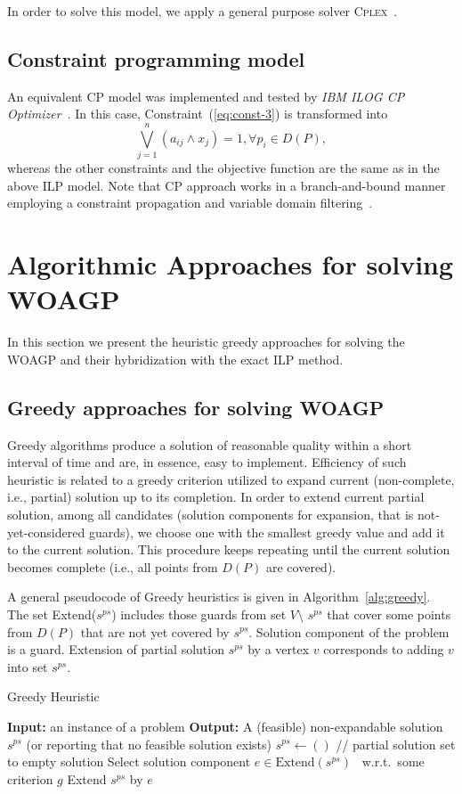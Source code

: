 \documentclass[runningheads,a4paper]{elsarticle}
\begin{document}
	In order to solve this model, we apply a general purpose solver \textsc{Cplex}~\cite{lima2010ibm}.
	\subsection{Constraint programming model} An equivalent CP model was implemented and tested by \textit{IBM ILOG CP Optimizer}~\cite{laborie2018ibm}. In this case,  Constraint~(\ref{eq:const-3}) is transformed into
	\begin{equation}
	\bigvee_{ j=1}^n (a_{ij} \wedge x_j) = 1, \forall p_i \in D(P),
	\end{equation}
	whereas the other constraints and the objective function are the same as in the above ILP model. Note that CP approach works in a branch-and-bound manner employing a constraint propagation and variable domain filtering~\cite{rossi2006handbook}.
	\section{Algorithmic Approaches for solving WOAGP}
	In this section we present the heuristic greedy approaches for solving the WOAGP and their hybridization with the exact ILP method.
	\subsection{Greedy approaches for solving WOAGP}
 Greedy algorithms produce a solution of reasonable quality within a short interval of time and are, in essence, easy to implement. Efficiency of such  heuristic is related to a greedy criterion utilized to expand current (non-complete, i.e., partial) solution up to its completion. In order to extend current partial solution, among all candidates (solution components for expansion, that is not-yet-considered guards),  we choose one with the smallest greedy value and add it to the current solution. This procedure keeps repeating until the current solution becomes complete (i.e., all points from $D(P)$ are covered).

 A general pseudocode of Greedy heuristics is given in Algorithm~\ref{alg:greedy}. 	The set Extend($s^{ps}$) includes those guards from set $V \setminus$ $s^{ps}$ that cover some points from $D(P)$ that are not yet covered by $s^{ps}$. Solution component of the problem is a guard. Extension of partial solution $s^{ps}$ by a vertex $v$ corresponds to adding $v$ into set $s^{ps}$.
	
	\begin{algorithm}[!t]
		\caption{Greedy Heuristic}\label{alg:greedy}
		\begin{algorithmic}[1]
			\State \textbf{Input:} an instance of a problem
			\State \textbf{Output:} A (feasible) non-expandable solution $s^{ps}$  (or reporting that no feasible solution exists)
			\State $s^{ps} \gets ()$ \hspace{0.3cm}// partial solution set to empty solution
			\State Select solution component $e \in  \text{Extend}(s^{ps})$  \  w.r.t.\  some criterion $g$
			\State Extend $s^{ps}$ by $e$
			\EndWhile
		\end{algorithmic}
	\end{algorithm}
\end{document}
